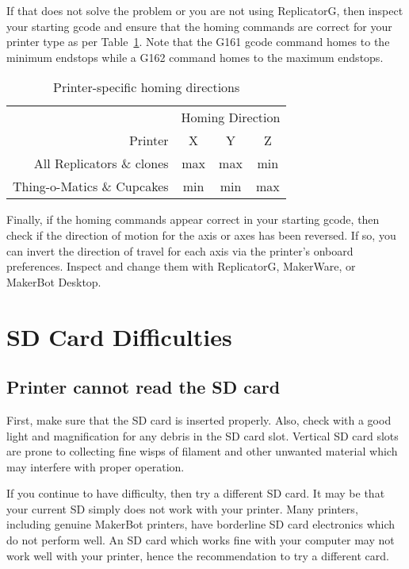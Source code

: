 If that does not solve the problem or you are not using ReplicatorG, then
inspect your starting gcode and ensure that the homing commands are
correct for your printer type as per Table~\ref{tab:homing}.  Note that
the G161 gcode command homes to the minimum endstops while a G162 command homes
to the maximum endstops.

\begin{table}[ht]
\ifpdf
\centering
\fi
\begin{tabular}{r | c c c }
\hline
& \multicolumn{3}{c}{Homing Direction}\\
Printer & X & Y & Z \\
\hline
All Replicators \& clones & max & max & min \\
Thing-o-Matics \& Cupcakes & min & min & max \\
\hline
\end{tabular}
\caption[Printer-specific homing directions]{Printer-specific homing directions}
\label{tab:homing}
\end{table}

Finally, if the homing commands appear correct in your starting gcode, then
check if the direction of motion for the axis or axes has been reversed.  If so, you can invert the direction of travel for each axis via the printer's
onboard preferences.  Inspect and change them with ReplicatorG, MakerWare,
or MakerBot Desktop.


\section{SD Card Difficulties}

\subsection{Printer cannot read the SD card}

First, make sure that the SD card is inserted properly.  Also, check with
a good light and magnification for any debris in the SD card slot.  Vertical
SD card slots are prone to collecting fine wisps of filament and other
unwanted material which may interfere with proper operation.

If you continue to have difficulty, then try a different SD card.  It may
be that your current SD simply does not work with your printer.  Many
printers, including genuine MakerBot printers, have borderline SD card
electronics which do not perform well.  An SD card which works fine with
your computer may not work well with your printer, hence the recommendation
to try a different card.

